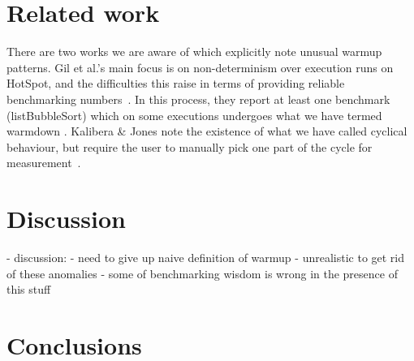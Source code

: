 \documentclass[10pt,preprint]{sigplanconf}
\newcommand{\kalibera}{Kalibera \& Jones\xspace}
\begin{document}


\section{Related work}

There are two works we are aware of which explicitly note unusual warmup
patterns. Gil et al.'s main focus is on non-determinism over execution runs on
HotSpot, and the difficulties this raise in terms of providing reliable
benchmarking numbers~\cite{gil11microbenchmark}. In this process, they report at
least one benchmark (listBubbleSort) which on some executions undergoes what we
have termed warmdown . \kalibera note the
existence of what we have called cyclical behaviour, but require the user to
manually pick one part of the cycle for measurement~\cite{kalibera13rigorous}.


\section{Discussion}
\label{sec:Discussion}

  - discussion:
    - need to give up naive definition of warmup
    - unrealistic to get rid of these anomalies
    - some of benchmarking wisdom is wrong in the presence of this stuff

\section{Conclusions}
\label{sec:conclusion}



\end{document}
